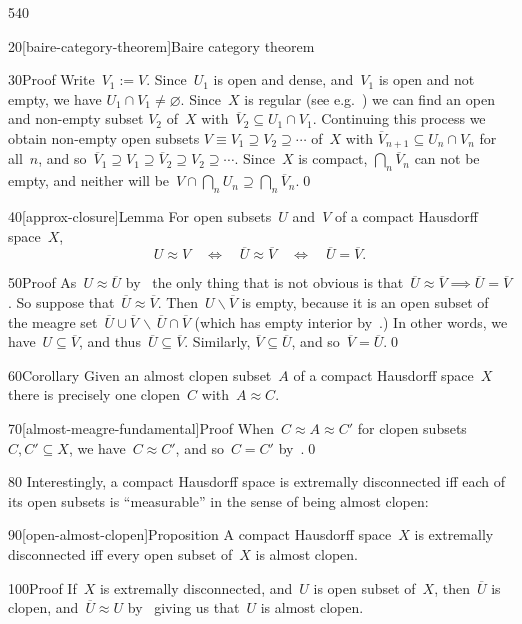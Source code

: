 \begin{parsec}{540}
\begin{point}{20}[baire-category-theorem]{Baire category theorem}
\begin{point}{30}{Proof}
Write~$V_1:=V$.
Since~$U_1$ is open and dense, and~$V_1$ is open and not empty,
we have $U_1\cap V_1\neq \varnothing$.
	Since~$X$ is regular (see e.g.~\cite{willard})
we can find an open and non-empty subset $V_2$ of~$X$
with~$\overline{V}_2\subseteq U_1\cap V_1$.
Continuing this process
we obtain non-empty open subsets $V\equiv V_1 \supseteq V_2\supseteq \dotsb$
	of~$X$ with $\overline{V}_{n+1} \subseteq U_n\cap V_n$
for all~$n$,
and so~$
\overline{V}_1 \supseteq V_1 
\supseteq \overline{V}_2 \supseteq V_2 
\supseteq \dotsb$.
Since~$X$ is compact,
$\bigcap_n \overline{V}_n$
can not be empty,
and neither will be~$V\cap \bigcap_n U_n
\supseteq \bigcap_n \overline{V}_n$.\qed
\end{point}
\end{point}
\begin{point}{40}[approx-closure]{Lemma}%
For open subsets~$U$ and~$V$ of a compact Hausdorff
space~$X$,
\begin{equation*}
U\approx V\quad\iff\quad
\overline{U}\approx \overline{V}
\quad\iff\quad
\overline{U}=\overline{V}.
\end{equation*}
\begin{point}{50}{Proof}%
As~$U\approx \overline{U}$ by~
the only thing that is not obvious
is that~$\overline{U}\approx \overline{V} \implies \overline{U}=\overline{V}$.
So suppose that~$\overline{U}\approx \overline{V}$.
Then~$U\backslash \overline{V}$
is empty, because it is an open subset of the
meagre set~$\overline{U}\cup\overline{V}\,\backslash\,
\overline{U}\cap\overline{V}$
(which has empty interior by~.) In other words,
we have~$U\subseteq \overline{V}$, 
and thus~$\overline{U}\subseteq \overline{V}$.
Similarly, $\overline{V}\subseteq\overline{U}$,
and so~$\overline{V}=\overline{U}$.\qed
\end{point}
\end{point}
\begin{point}{60}{Corollary}%
Given an almost clopen subset~$A$ of a compact Hausdorff
space~$X$ there is precisely one clopen~$C$ with~$A\approx C$.
\begin{point}{70}[almost-meagre-fundamental]{Proof}%
When~$C\approx A \approx C'$
for clopen subsets~$C,C'\subseteq X$,
we have~$C\approx C'$,
and so~$C=C'$ by~.\qed
\end{point}
\end{point}
\begin{point}{80}%
Interestingly,
a compact Hausdorff space is extremally disconnected
iff each of its open subsets is ``measurable''
in the sense of being almost clopen:
\end{point}
\begin{point}{90}[open-almost-clopen]{Proposition}%
A compact Hausdorff space~$X$
is extremally disconnected
iff every open subset of~$X$
is almost clopen.
\begin{point}{100}{Proof}%
If~$X$ is extremally disconnected,
and~$U$ is open subset of~$X$,
then~$\overline{U}$ is clopen,
and~$\overline{U}\approx U$ by~
giving us that~$U$ is almost clopen.


\end{point}
\end{point}
\end{parsec}
